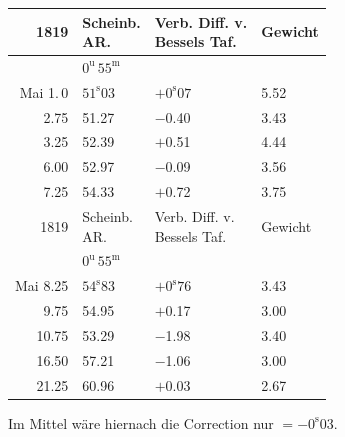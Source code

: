 \begin{center}
\begin{tabular}{r|l|l|l}
1819  &  \shortstack{Scheinb.\\AR.}  &  \shortstack{Verb. Diff. v.\\Bessels Taf.}  &  Gewicht  \\
\hline
 &  $0^{\mathrm u}\,55^{\mathrm m}$  &   &   \\
Mai 1.\,0  &  $51^{\mathrm s}03$  &  $+0^{\mathrm s}07$  &  5.52  \\
2.75  &  51.27  &  $-$0.40  &  3.43  \\
3.25  &  52.39  &  $+$0.51  &  4.44  \\
6.00  &  52.97  &  $-$0.09  &  3.56  \\
7.25  &  54.33  &  $+$0.72  &  3.75  \\
\hline
 1819  &  \shortstack{Scheinb.\\AR.}  &  \shortstack{Verb. Diff. v.\\Bessels Taf.}  &  Gewicht  \\
\hline
  &  $0^{\mathrm u}\,55^{\mathrm m}$  &   &   \\
 Mai 8.25  &  $54^{\mathrm s}83$  &  $+0^{\mathrm s}76$  &  3.43  \\
 9.75  &  54.95  &  $+$0.17  &  3.00  \\
 10.75  &  53.29  &  $-$1.98  &  3.40  \\
 16.50  &  57.21  &  $-$1.06  &  3.00  \\
 21.25  &  60.96  &  $+$0.03  &  2.67  \\
\end{tabular}
\end{center}

Im Mittel wäre hiernach die Correction nur $= -0^{\mathrm s}03$.

